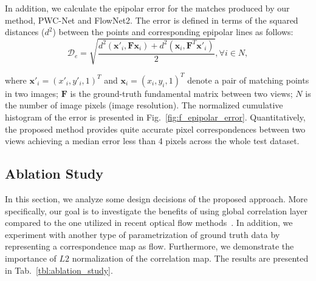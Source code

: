 \documentclass[10pt,twocolumn,letterpaper]{article}
\begin{document}
In addition, we calculate the epipolar error for the matches produced by our method, PWC-Net and FlowNet2. The error is defined in terms of the squared distances ($d^2$) between the points and corresponding epipolar lines as follows:
\begin{equation}\label{eq:eq_epipolar_err}
    \mathcal{D}_{e} = \sqrt{\frac{d^2\left(\mathbf{x}'_i,\mathbf{F}\mathbf{x}_i\right) + d^2\left(\mathbf{x}_i,\mathbf{F}^{T}\mathbf{x'}_i\right)}{2}}, \forall i \in N,
\end{equation}

\noindent where $\mathbf{x'}_i=(x'_{i}, y'_i, 1)^{T}$ and $\mathbf{x}_i=(x_{i}, y_{i}, 1)^{T}$ denote a pair of matching points in two images;  $\mathbf{F}$ is the ground-truth fundamental matrix between two views; $N$ is the number of image pixels (image resolution). 
The normalized cumulative histogram of the error is presented in Fig.~\ref{fig:f_epipolar_error}. Quantitatively, the proposed method provides quite accurate pixel correspondences between two views achieving a median error less than 4 pixels across the whole test dataset.

\vspace{-1mm}
\subsection{Ablation Study}\label{ssec:ablation_study}
In this section, we analyze some design decisions of the proposed approach. More specifically, our goal is to investigate the benefits of using global correlation layer compared to the one utilized in recent optical flow methods~\cite{FlowNet2,PWC-Net}. In addition, we experiment with another type of parametrization of ground truth data by representing a correspondence map as flow. Furthermore, we demonstrate the importance of $L2$ normalization of the correlation map. The results are presented in Tab.~\ref{tbl:ablation_study}.
\end{document}
